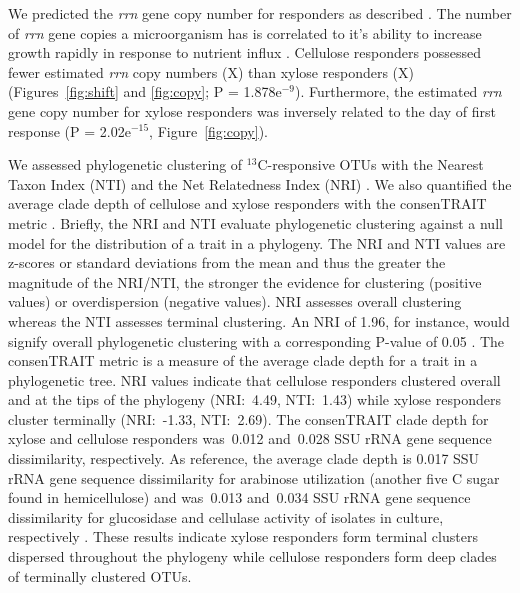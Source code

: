 We predicted the \textit{rrn} gene copy number for responders as described
\citep{Kembel_2012}. The number of \textit{rrn} gene copies
a microorganism has is correlated to it's ability to increase growth
rapidly in response to nutrient influx \citep{Klappenbach_2000}. Cellulose
responders possessed fewer estimated \textit{rrn} copy numbers (X) than xylose
responders (X) (Figures~\ref{fig:shift} and \ref{fig:copy};
P = 1.878e$^{-9}$). Furthermore, the estimated \textit{rrn} gene copy
number for xylose responders was inversely related to the day of first
response (P = 2.02e$^{-15}$, Figure~\ref{fig:copy}).

We assessed phylogenetic clustering of $^{13}$C-responsive OTUs with the
Nearest Taxon Index (NTI) and the Net Relatedness Index (NRI)
\citep{Webb2000}. We also quantified the average clade depth of cellulose and
xylose responders with the consenTRAIT metric \citep{Martiny2013}. Briefly, the
NRI and NTI evaluate phylogenetic clustering against a null model for the
distribution of a trait in a phylogeny. The NRI and NTI values are z-scores or
standard deviations from the mean and thus the greater the magnitude of the
NRI/NTI, the stronger the evidence for clustering (positive values) or
overdispersion (negative values). NRI assesses overall clustering whereas the
NTI assesses terminal clustering. An NRI of 1.96, for instance, would signify
overall phylogenetic clustering with a corresponding P-value of 0.05
\citep{Evans2014a}. The consenTRAIT metric is a measure of the average clade
depth for a trait in a phylogenetic tree. NRI values indicate that cellulose
responders clustered overall and at the tips of the phylogeny (NRI:~4.49,
NTI:~1.43) while xylose responders cluster terminally (NRI:~-1.33, NTI:~2.69).
The consenTRAIT clade depth for xylose and cellulose responders was~0.012
and~0.028 SSU rRNA gene sequence dissimilarity, respectively. As reference, the
average clade depth is 0.017 SSU rRNA gene sequence dissimilarity for arabinose
utilization (another five C sugar found in hemicellulose) and was~0.013
and~0.034 SSU rRNA gene sequence dissimilarity for glucosidase and cellulase
activity of isolates in culture, respectively
\citep{Martiny2013,Berlemont2013}. These results indicate xylose responders
form terminal clusters dispersed throughout the phylogeny while cellulose
responders form deep clades of terminally clustered OTUs.
